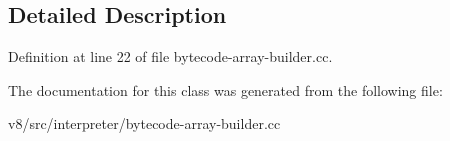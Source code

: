 \subsection{Detailed Description}


Definition at line 22 of file bytecode-\/array-\/builder.\+cc.



The documentation for this class was generated from the following file\+:\begin{DoxyCompactItemize}
\item 
v8/src/interpreter/bytecode-\/array-\/builder.\+cc\end{DoxyCompactItemize}
